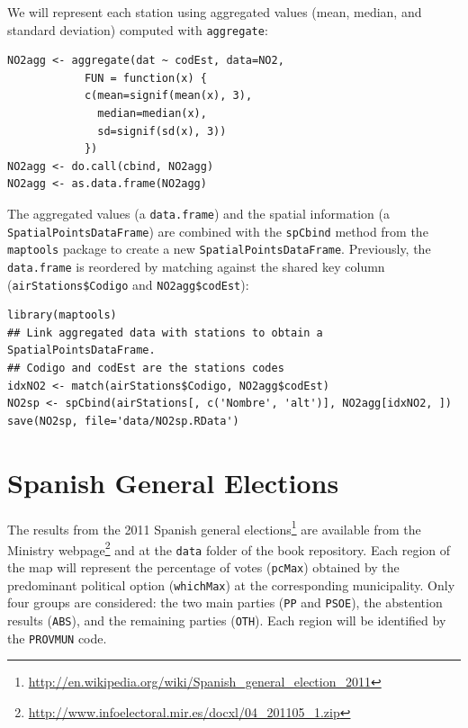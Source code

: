 \documentclass[smallroyalvopaper]{memoir}
\begin{document}
We will represent each station using aggregated values (mean, median,
and standard deviation) computed with \texttt{aggregate}:


\lstset{language=R,numbers=none}
\begin{lstlisting}
NO2agg <- aggregate(dat ~ codEst, data=NO2,
		    FUN = function(x) {
			c(mean=signif(mean(x), 3),
			  median=median(x),
			  sd=signif(sd(x), 3))
			})
NO2agg <- do.call(cbind, NO2agg)
NO2agg <- as.data.frame(NO2agg)
\end{lstlisting}

The aggregated values (a \texttt{data.frame}) and the spatial information (a
\texttt{SpatialPointsDataFrame}) are combined with the \texttt{spCbind} method from
the \texttt{maptools} package to create a new
\texttt{SpatialPointsDataFrame}. Previously, the \texttt{data.frame} is reordered by
matching against the shared key column (\texttt{airStations\$Codigo} and
\texttt{NO2agg\$codEst}):

 

\lstset{language=R,numbers=none}
\begin{lstlisting}
library(maptools)
## Link aggregated data with stations to obtain a SpatialPointsDataFrame.
## Codigo and codEst are the stations codes
idxNO2 <- match(airStations$Codigo, NO2agg$codEst)
NO2sp <- spCbind(airStations[, c('Nombre', 'alt')], NO2agg[idxNO2, ])
save(NO2sp, file='data/NO2sp.RData')
\end{lstlisting}

\section{Spanish General Elections}
\label{sec-2}
The results from the 2011 Spanish general elections\footnote{\url{http://en.wikipedia.org/wiki/Spanish_general_election_2011}} are
available from the Ministry webpage\footnote{\url{http://www.infoelectoral.mir.es/docxl/04_201105_1.zip}} and at the \texttt{data} folder of
the book repository. Each region of the map will represent the
percentage of votes (\texttt{pcMax}) obtained by the predominant political
option (\texttt{whichMax}) at the corresponding municipality.  Only four
groups are considered: the two main parties (\texttt{PP} and \texttt{PSOE}), the
abstention results (\texttt{ABS}), and the remaining parties (\texttt{OTH}). Each
region will be identified by the \texttt{PROVMUN} code.
\end{document}
